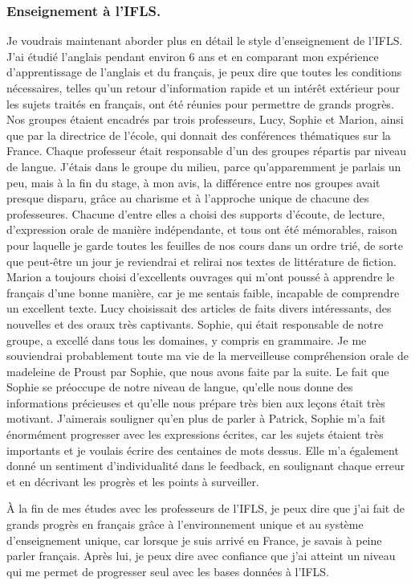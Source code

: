 \documentclass[a4paper,12pt]{article}
\begin{document}
\subsubsection{Enseignement à l'IFLS.}

Je voudrais maintenant aborder plus en détail le style d'enseignement de l'IFLS. J'ai étudié l'anglais pendant environ 6 ans et en comparant mon expérience d'apprentissage de l'anglais et du français, je peux dire que toutes les conditions nécessaires, telles qu'un retour d'information rapide et un intérêt extérieur pour les sujets traités en français, ont été réunies pour permettre de grands progrès. Nos groupes étaient encadrés par trois professeurs, Lucy, Sophie et Marion, ainsi que par la directrice de l'école, qui donnait des conférences thématiques sur la France. Chaque professeur était responsable d'un des groupes répartis par niveau de langue. J'étais dans le groupe du milieu, parce qu'apparemment je parlais un peu, mais à la fin du stage, à mon avis, la différence entre nos groupes avait presque disparu, grâce au charisme et à l'approche unique de chacune des professeures. Chacune d'entre elles a choisi des supports d'écoute, de lecture, d'expression orale de manière indépendante, et tous ont été mémorables, raison pour laquelle je garde toutes les feuilles de nos cours dans un ordre trié, de sorte que peut-être un jour je reviendrai et relirai nos textes de littérature de fiction. Marion a toujours choisi d'excellents ouvrages qui m'ont poussé à apprendre le français d'une bonne manière, car je me sentais faible, incapable de comprendre un excellent texte. Lucy choisissait des articles de faits divers intéressants, des nouvelles et des oraux très captivants. Sophie, qui était responsable de notre groupe, a excellé dans tous les domaines, y compris en grammaire. Je me souviendrai probablement toute ma vie de la merveilleuse compréhension orale de madeleine de Proust par Sophie, que nous avons faite par la suite. Le fait que Sophie se préoccupe de notre niveau de langue, qu'elle nous donne des informations précieuses et qu'elle nous prépare très bien aux leçons était très motivant. J'aimerais souligner qu'en plus de parler à Patrick, Sophie m'a fait énormément progresser avec les expressions écrites, car les sujets étaient très importants et je voulais écrire des centaines de mots dessus. Elle m'a également donné un sentiment d'individualité dans le feedback, en soulignant chaque erreur et en décrivant les progrès et les points à surveiller.

À la fin de mes études avec les professeurs de l'IFLS, je peux dire que j'ai fait de grands progrès en français grâce à l'environnement unique et au système d'enseignement unique, car lorsque je suis arrivé en France, je savais à peine parler français. Après lui, je peux dire avec confiance que j'ai atteint un niveau qui me permet de progresser seul avec les bases données à l'IFLS. 
\end{document}

